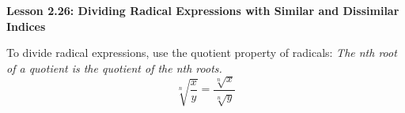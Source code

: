 \begin{center}
\textbf{Lesson 2.26: Dividing Radical Expressions with Similar and Dissimilar Indices}
\end{center}

\vspace*{-1.5ex}

To divide radical expressions, use the quotient property of radicals: \textit{The nth root of a quotient is the quotient of the nth roots.}
\[\sqrt[{\scriptstyle n}]{\dfrac{x}{y}} = \dfrac{\sqrt[{\scriptstyle n}]{x}}{\sqrt[{\scriptstyle n}]{y}}\]
